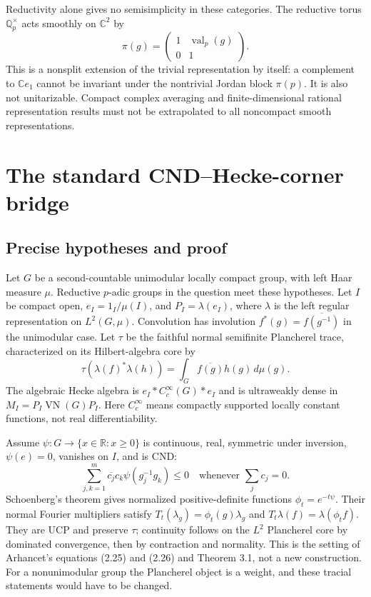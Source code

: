 \documentclass[11pt]{article}
\theoremstyle{remark}\newtheorem{remark}[definition]{Remark}
\newcommand{\VN}{\operatorname{VN}}
\newcommand{\C}{\mathbb{C}}
\newcommand{\R}{\mathbb{R}}
\newcommand{\Q}{\mathbb{Q}}
\begin{document}
Reductivity alone gives no semisimplicity in these categories. The reductive
torus $\Q_p^\times$ acts smoothly on $\C^2$ by
\[
 \pi(g)=\begin{pmatrix}1&\operatorname{val}_p(g)\\0&1\end{pmatrix}.
\]
This is a nonsplit extension of the trivial representation by itself:
a complement to $\C e_1$ cannot be invariant under the nontrivial Jordan
block $\pi(p)$. It is also not unitarizable. Compact complex averaging and
finite-dimensional rational representation results must not be extrapolated
to all noncompact smooth representations.

\section{The standard CND--Hecke-corner bridge}
\subsection{Precise hypotheses and proof}
Let $G$ be a second-countable unimodular locally compact group, with left Haar
measure $\mu$. Reductive $p$-adic groups in the question meet these hypotheses.
Let $I$ be compact open, $e_I=1_I/\mu(I)$, and $P_I=\lambda(e_I)$, where
$\lambda$ is the left regular representation on $L^2(G,\mu)$.
Convolution has involution $f^*(g)=\overline{f(g^{-1})}$ in the unimodular
case. Let $\tau$ be the faithful normal semifinite Plancherel trace,
characterized on its Hilbert-algebra core by
\[
 \tau(\lambda(f)^*\lambda(h))=\int_G\overline{f(g)}h(g)\,d\mu(g).
\]
The algebraic Hecke algebra is $e_I*C_c^\infty(G)*e_I$ and is ultraweakly
dense in $M_I=P_I\VN(G)P_I$. Here $C_c^\infty$ means compactly supported
locally constant functions, not real differentiability.

Assume $\psi:G\to\{x\in\R:x\geq0\}$ is continuous, real, symmetric under inversion,
$\psi(e)=0$, vanishes on $I$, and is CND:
\[
 \sum_{j,k=1}^m\overline{c_j}c_k\psi(g_j^{-1}g_k)\leq0
 \quad\text{whenever }\sum_jc_j=0.
\]
Schoenberg's theorem gives normalized positive-definite functions
$\phi_t=e^{-t\psi}$. Their normal Fourier multipliers satisfy
$T_t(\lambda_g)=\phi_t(g)\lambda_g$ and
$T_t\lambda(f)=\lambda(\phi_t f)$. They are UCP and preserve $\tau$;
continuity follows on the $L^2$ Plancherel core by dominated convergence,
then by contraction and normality. This is the setting of
Arhancet's equations (2.25) and (2.26) and Theorem 3.1, not a new construction.
For a nonunimodular group the Plancherel object is a weight, and these
tracial statements would have to be changed.
\end{document}
